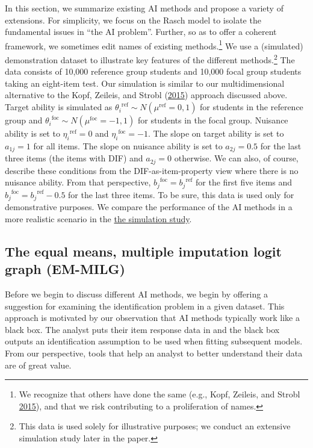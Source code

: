 \documentclass[
  11pt,
]{article}
\begin{document}
In this section, we summarize existing AI methods and propose a variety of extensions. For simplicity, we focus on the Rasch model to isolate the fundamental issues in \enquote{the AI problem}. Further, so as to offer a coherent framework, we sometimes edit names of existing methods.\footnote{We recognize that others have done the same (e.g., Kopf, Zeileis, and Strobl \protect\hyperlink{ref-kopf2015framework}{2015}), and that we risk contributing to a proliferation of names.} We use a (simulated) demonstration dataset to illustrate key features of the different methods.\footnote{This data is used solely for illustrative purposes; we conduct an extensive simulation study later in the paper.} The data consists of 10,000 reference group students and 10,000 focal group students taking an eight-item test. Our simulation is similar to our multidimensional alternative to the Kopf, Zeileis, and Strobl (\protect\hyperlink{ref-kopf2015framework}{2015}) approach discussed above. Target ability is simulated as \({\theta_i}^{\text{ref}} \sim N(\mu^\text{ref} = 0,1)\) for students in the reference group and \({\theta_i}^{\text{foc}} \sim N(\mu^\text{foc} = -1,1)\) for students in the focal group. Nuisance ability is set to \({\eta_i}^{\text{ref}} = 0\) and \({\eta_i}^{\text{foc}} = -1\). The slope on target ability is set to \(a_{1j} = 1\) for all items. The slope on nuisance ability is set to \(a_{2j} = 0.5\) for the last three items (the items with DIF) and \(a_{2j} = 0\) otherwise. We can also, of course, describe these conditions from the DIF-as-item-property view where there is no nuisance ability. From that perspective, \({b_j}^{\text{foc}} = {b_j}^{\text{ref}}\) for the first five items and \({b_j}^{\text{foc}} = {b_j}^{\text{ref}} - 0.5\) for the last three items. To be sure, this data is used only for demonstrative purposes. We compare the performance of the AI methods in a more realistic scenario in the \protect\hyperlink{simstudy}{the simulation study}.

\hypertarget{emmilg}{%
\subsection{The equal means, multiple imputation logit graph (EM-MILG)}\label{emmilg}}

Before we begin to discuss different AI methods, we begin by offering a suggestion for examining the identification problem in a given dataset. This approach is motivated by our observation that AI methods typically work like a black box. The analyst puts their item response data in and the black box outputs an identification assumption to be used when fitting subsequent models. From our perspective, tools that help an analyst to better understand their data are of great value.
\end{document}
